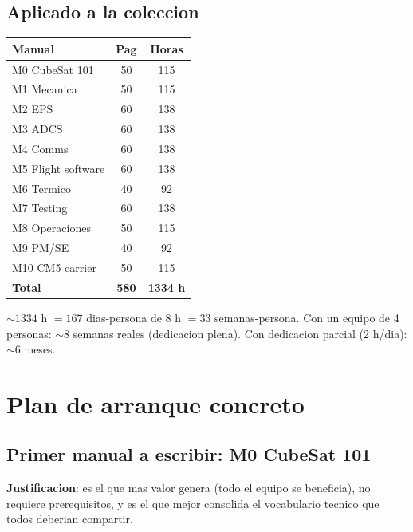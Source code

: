 \documentclass[11pt,a4paper,oneside]{report}
\begin{document}
\section{Aplicado a la coleccion}

\begin{center}
\begin{tabular}{lcc}
\toprule
\textbf{Manual} & \textbf{Pag} & \textbf{Horas} \\
\midrule
M0 CubeSat 101                       & 50 & 115 \\
M1 Mecanica                          & 50 & 115 \\
M2 EPS                                & 60 & 138 \\
M3 ADCS                               & 60 & 138 \\
M4 Comms                              & 60 & 138 \\
M5 Flight software                    & 60 & 138 \\
M6 Termico                            & 40 & 92  \\
M7 Testing                            & 60 & 138 \\
M8 Operaciones                        & 50 & 115 \\
M9 PM/SE                              & 40 & 92  \\
M10 CM5 carrier                       & 50 & 115 \\
\midrule
\textbf{Total}                       & \textbf{580} & \textbf{1334 h} \\
\bottomrule
\end{tabular}
\end{center}

$\sim 1334$ h $= 167$ dias-persona de 8 h $= 33$ semanas-persona.
Con un equipo de 4 personas: $\sim 8$ semanas reales (dedicacion plena).
Con dedicacion parcial (2 h/dia): $\sim 6$ meses.

\chapter{Plan de arranque concreto}

\section{Primer manual a escribir: M0 CubeSat 101}

\textbf{Justificacion}: es el que mas valor genera (todo el equipo se
beneficia), no requiere prerequisitos, y es el que mejor consolida el
vocabulario tecnico que todos deberian compartir.
\end{document}

